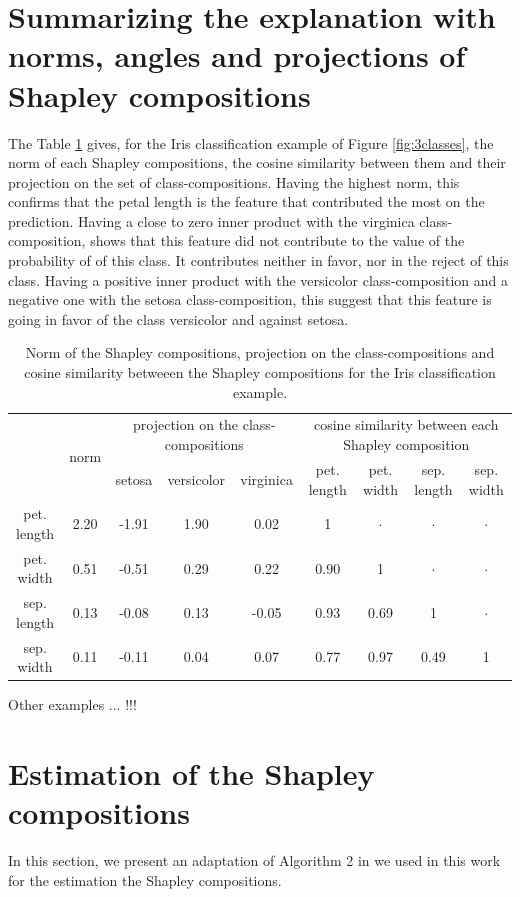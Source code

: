 \documentclass{article}
\theoremstyle{plain}
\theoremstyle{definition}
\theoremstyle{remark}
\begin{document}
\newpage
\section{Summarizing the explanation with norms, angles and projections of Shapley compositions}
\label{app:summarize}

The Table \ref{tab:normiris} gives, for the Iris classification example of Figure \ref{fig:3classes}, the norm of each Shapley compositions, the cosine similarity between them and their projection on the set of class-compositions. Having the highest norm, this confirms that the petal length is the feature that contributed the most on the prediction. Having a close to zero inner product with the virginica class-composition, shows that this feature did not contribute to the value of the probability of of this class. It contributes neither in favor, nor in the reject of this class. Having a positive inner product with the versicolor class-composition and a negative one with the setosa class-composition, this suggest that this feature is going in favor of the class versicolor and against setosa.
\begin{table}
  \centering
  \caption{Norm of the Shapley compositions, projection on the class-compositions and cosine similarity betweeen the Shapley compositions for the Iris classification example.}
  \begin{tabular}{c|c|ccc|cccc|}
    \cline{2-9}
    & \multirow{2}{*}{norm} & \multicolumn{3}{c|}{projection on the class-compositions} & \multicolumn{4}{c|}{cosine similarity between each Shapley composition} \\
    \cline{3-9}
     & & setosa & versicolor & virginica & pet. length & pet. width & sep. length & sep. width \\
    \hline
    pet. length & 2.20  & -1.91 & 1.90 & 0.02 & 1 &$\cdot$ &$\cdot$ &$\cdot$ \\
    pet. width & 0.51 & -0.51 & 0.29 & 0.22 & 0.90 & 1 &$\cdot$ &$\cdot$ \\
    sep. length & 0.13 & -0.08 & 0.13 & -0.05 & 0.93 & 0.69 & 1 &$\cdot$ \\
    sep. width & 0.11 & -0.11 & 0.04 & 0.07 & 0.77 & 0.97 & 0.49 &1 \\
    \hline
  \end{tabular}
  \label{tab:normiris}
\end{table}

Other examples ... !!!

\newpage
\section{Estimation of the Shapley compositions}
\label{app:algo}
In this section, we present an adaptation of Algorithm 2 in \cite{vstrumbelj2014explaining} we used in this work for the estimation the Shapley compositions.
\end{document}
